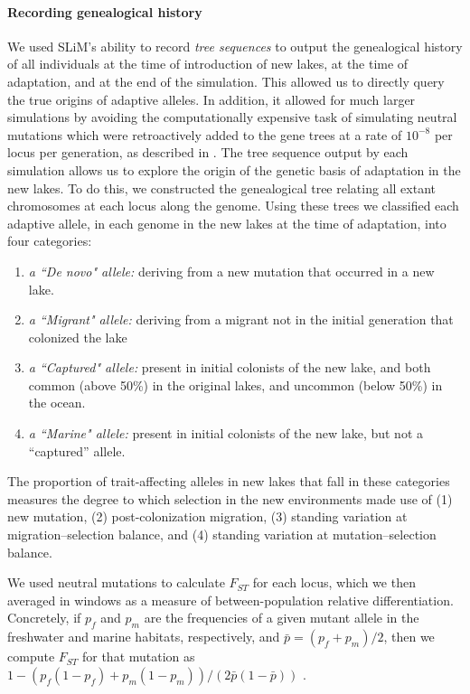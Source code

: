 \documentclass{article}
\begin{document}
\paragraph{Recording genealogical history}

We used SLiM's ability to record \emph{tree sequences} \citep{haller2018treesequence,Kelleher2016} to output the genealogical history of all individuals at the time of introduction of new lakes, at the time of adaptation, and at the end of the simulation. This allowed us to directly query the true origins of adaptive alleles. 
In addition, it allowed for much larger simulations by avoiding the computationally expensive task of simulating neutral mutations which were retroactively added to the gene trees at a rate of $10^{-8}$ per locus per generation, as described in \citet{kelleher2018efficient}.
The tree sequence output by each simulation allows us to explore the origin of the genetic basis of adaptation in the new lakes. 
To do this, we constructed the genealogical tree relating all extant chromosomes at each locus along the genome. 
Using these trees we classified each adaptive allele, in each genome in the new lakes at the time of adaptation, into four categories:

\begin{enumerate}
    \item \emph{a ``De novo" allele:}
        deriving from a new mutation that occurred in a new lake.
    \item \emph{a ``Migrant" allele:} 
        deriving from a migrant not in the initial generation that colonized the lake
    \item \emph{a ``Captured" allele:}
        present in initial colonists of the new lake, 
        and both common (above 50\%) in the original lakes,
        and uncommon (below 50\%) in the ocean.
    \item \emph{a ``Marine" allele:} 
        present in initial colonists of the new lake, 
        but not a ``captured'' allele.
\end{enumerate}

The proportion of trait-affecting alleles in new lakes that fall in these categories measures the degree to which selection in the new environments made use of (1) new mutation, (2) post-colonization migration, (3) standing variation at migration--selection balance, and (4) standing variation at mutation--selection balance.

We used neutral mutations to calculate $F_{ST}$ for each locus, which we then averaged in windows as a measure of between-population relative differentiation. 
Concretely, if $p_f$ and $p_m$ are the frequencies of a given mutant allele in the freshwater and marine habitats, respectively, and $\bar p = (p_f + p_m)/2$, 
then we compute $F_{ST}$ for that mutation as $1 - (p_f (1-p_f) + p_m (1-p_m))/ (2 \bar p (1-\bar p))$ \citep{Gillespie_1998}. 
\end{document}
